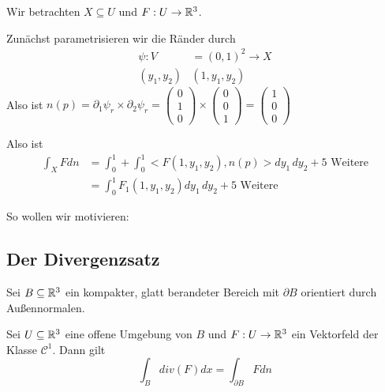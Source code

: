 \documentclass[main.tex]{subfiles}
\begin{document}
\begin{Beispiel}[$X = \partial B \quad B = {[0,1]}^3$]
  Wir betrachten $X \subseteq U$ und $F: U \to \mathbb{R}^3$.

  Zunächst parametrisieren wir die Ränder durch
  $$\begin{aligned}
    \psi: V & = (0,1)^2 \to X \\
    (y_1,y_2) & (1,y_1,y_2)
  \end{aligned}$$
  Also ist $n(p) = \partial_1 \psi_r \times \partial_2 \psi_r = \begin{pmatrix}
    0 \\ 1 \\ 0
  \end{pmatrix} \times \begin{pmatrix}
    0 \\ 0 \\ 1
  \end{pmatrix} = \begin{pmatrix}
    1 \\ 0 \\ 0
  \end{pmatrix}$

  Also ist
  $$\begin{aligned}
    \int_X F dn & = \int_0^1 + \int_0^1 <F(1,y_1,y_2), n(p)> dy_1 \, dy_2 + 5 \text{ Weitere} \\
    & = \int_0^1 F_1(1,y_1,y_2) dy_1 \, dy_2 + 5 \text{ Weitere}
  \end{aligned}$$
\end{Beispiel}

So wollen wir motivieren:

\subsection{Der Divergenzsatz}

\begin{Theorem}
  Sei $B \subseteq \mathbb{R}^3$ ein kompakter, glatt berandeter Bereich mit $\partial B$ orientiert durch Außennormalen.

  Sei $U \subseteq \mathbb{R}^3$ eine offene Umgebung von $B$ und $F: U \to \mathbb{R}^3$ ein Vektorfeld der Klasse $\mathcal{C}^1$. Dann gilt
  $$\int_B div(F)dx = \int_{\partial B} F dn$$
\end{Theorem}
\end{document}
